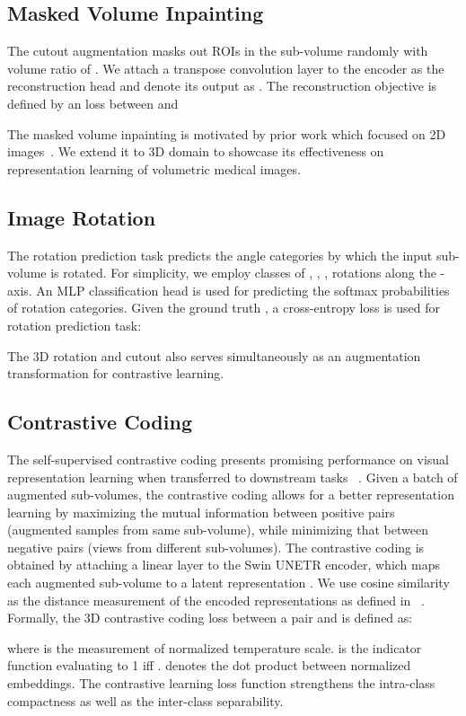 \documentclass[10pt,twocolumn,letterpaper]{article}
\begin{document}
\subsection{Masked Volume Inpainting}
The cutout augmentation masks out ROIs in the  sub-volume  randomly with volume ratio of . We attach a transpose convolution layer to the encoder as the reconstruction head and denote its output as . The reconstruction objective is defined by an  loss between  and 

The masked volume inpainting is motivated by prior work which focused on 2D images~\cite{pathak2016context}. We extend it to 3D domain to showcase its effectiveness on representation learning of volumetric medical images.


\subsection{Image Rotation}
The rotation prediction task predicts the angle categories by which the input sub-volume is rotated. For simplicity, we employ  classes of , , ,  rotations along the -axis. An MLP classification head is used for predicting the softmax probabilities  of rotation categories. Given the ground truth , a cross-entropy loss is used for rotation prediction task:

The 3D rotation and cutout also serves simultaneously as an augmentation transformation for contrastive learning. 

\subsection{Contrastive Coding}
The self-supervised contrastive coding presents promising performance on visual representation learning when transferred to downstream tasks ~\cite{chen2020simple, park2020contrastive}. Given a batch of augmented sub-volumes, the contrastive coding allows for a better representation learning by maximizing the mutual information between positive pairs (augmented samples from same sub-volume), while minimizing that between negative pairs (views from different sub-volumes). The contrastive coding is obtained by attaching a linear layer to the Swin UNETR encoder, which maps each augmented sub-volume to a latent representation . We use cosine similarity as the distance measurement of the encoded representations as defined in ~\cite{chen2020simple}. Formally, the 3D contrastive coding loss between a pair  and  is defined as:

where  is the measurement of normalized temperature scale.  is the indicator function evaluating to 1 iff .  denotes the dot product between normalized embeddings. The contrastive learning loss function strengthens the intra-class compactness as well as the inter-class separability.
\end{document}
